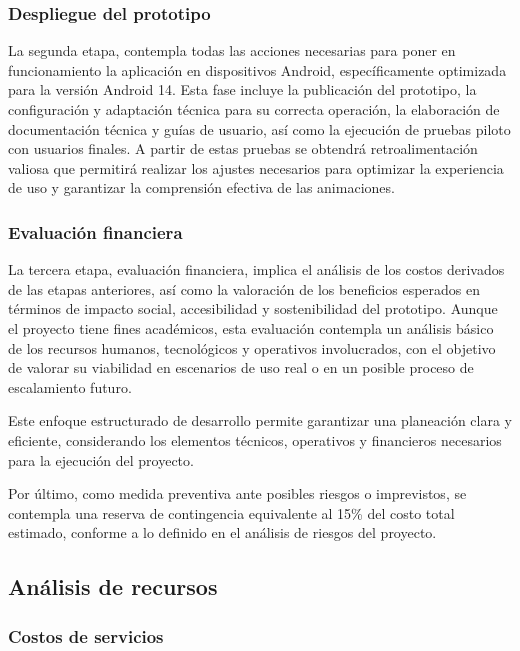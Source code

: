 \subsubsection{Despliegue del prototipo}

La segunda etapa, contempla todas las acciones necesarias para poner en funcionamiento la aplicación en dispositivos Android, específicamente optimizada para la versión Android 14. Esta fase incluye la publicación del prototipo, la configuración y adaptación técnica para su correcta operación, la elaboración de documentación técnica y guías de usuario, así como la ejecución de pruebas piloto con usuarios finales. A partir de estas pruebas se obtendrá retroalimentación valiosa que permitirá realizar los ajustes necesarios para optimizar la experiencia de uso y garantizar la comprensión efectiva de las animaciones.

\subsubsection{Evaluación financiera}

La tercera etapa, evaluación financiera, implica el análisis de los costos derivados de las etapas anteriores, así como la valoración de los beneficios esperados en términos de impacto social, accesibilidad y sostenibilidad del prototipo. Aunque el proyecto tiene fines académicos, esta evaluación contempla un análisis básico de los recursos humanos, tecnológicos y operativos involucrados, con el objetivo de valorar su viabilidad en escenarios de uso real o en un posible proceso de escalamiento futuro.

Este enfoque estructurado de desarrollo permite garantizar una planeación clara y eficiente, considerando los elementos técnicos, operativos y financieros necesarios para la ejecución del proyecto.

Por último, como medida preventiva ante posibles riesgos o imprevistos, se contempla una reserva de contingencia equivalente al 15\% del costo total estimado, conforme a lo definido en el análisis de riesgos del proyecto.


\subsection{Análisis de recursos}

\subsubsection{Costos de servicios}

